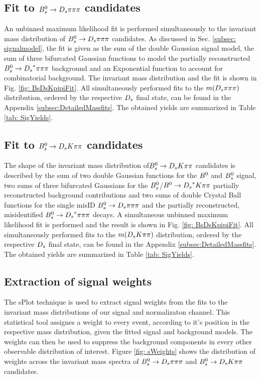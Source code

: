 \subsection{Fit to ${{B}^0_{s}}\rightarrow{\ensuremath{{D}_{s}}}{\ensuremath{\pi}}{\ensuremath{\pi}}{\ensuremath{\pi}}$ candidates}
\label{subsec: NormFit}

An unbinned maximum likelihood fit is performed simultaneously to the invariant mass distribution of ${{B}^0_{s}}\rightarrow{\ensuremath{{D}_{s}}}{\ensuremath{\pi}}{\ensuremath{\pi}}{\ensuremath{\pi}}$ candidates. 
As discussed in Sec. \ref{subsec: signalmodel}, the fit is given as the sum of the double Gaussian signal model, the sum of three bifurcated Gaussian functions to model the partially reconstructed ${{B}^0_{s}}\rightarrow{\ensuremath{{D}_{s}}}^{*}{\pi}{\pi}{\pi}$ background and an Exponential function to account for combinatorial background. The invariant mass distribution and the fit is shown in Fig. \ref{fig: BsDsKpipiFit}. 
All simultaneously performed fits to the $m({{D}_{s}}{\pi}{\pi}{\pi})$ distribution, ordered by the respective ${{D}_{s}}$ final state, can be found in the Appendix \ref{subsec:DetailedMassfits}.   
The obtained yields are summarized in Table \ref{tab: SigYields}. 


\subsection{Fit to ${{B}^0_{s}}\rightarrow{\ensuremath{{D}_{s}}}{\ensuremath{K}}{\ensuremath{\pi}}{\ensuremath{\pi}}$ candidates}
\label{subsec: SigFit}

The shape of the invariant mass distribution of${{B}^0_{s}}\rightarrow{\ensuremath{{D}_{s}}}{\ensuremath{K}}{\ensuremath{\pi}}{\ensuremath{\pi}}$ candidates is described by the sum of two double Gaussian functions for the ${{B}^0}$ and ${{B}^0_{s}}$ signal, 
two sums of three bifurcated Gaussians for the ${{B}^0_{s}}$/${{B}^0}\rightarrow{\ensuremath{{D}_{s}}}^{*}{K}{\pi}{\pi}$ partially reconstructed background contributions and 
two sums of double Crystal Ball functions for the single misID ${{B}^0_{s}}\rightarrow{\ensuremath{{D}_{s}}}{\ensuremath{\pi}}{\ensuremath{\pi}}{\ensuremath{\pi}}$ and the partially reconstructed, misidentified ${{B}^0_{s}}\rightarrow{\ensuremath{{D}_{s}}}^{*}{\pi}{\pi}{\pi}$ decays. 
A simultaneous unbinned maximum likelihood fit is performed and the result is shown in Fig. \ref{fig: BsDsKpipiFit}.
All simultaneously performed fits to the $m({{D}_{s}}{K}{\pi}{\pi})$ distribution, ordered by the respective ${{D}_{s}}$ final state, can be found in the Appendix \ref{subsec:DetailedMassfits}.
The obtained yields are summarized in Table \ref{tab: SigYields}.
 

\subsection{Extraction of signal weights}
\label{subsec: sWegihts}

The sPlot technique \cite{Pivk:2004ty} is used to extract signal weights from the fits to the invariant mass distributions of our signal and normalizaton channel. 
This statistical tool assignes a weight to every event, according to it's position in the respective mass distribution, given the fitted signal and background models. 
The weights can then be used to suppress the background components in every other observable distribution of interest.  
Figure \ref{fig: sWeights} shows the distribution of weights across the invariant mass spectra of ${{B}^0_{s}}\rightarrow{\ensuremath{{D}_{s}}}{\ensuremath{\pi}}{\ensuremath{\pi}}{\ensuremath{\pi}}$ and ${{B}^0_{s}}\rightarrow{\ensuremath{{D}_{s}}}{\ensuremath{K}}{\ensuremath{\pi}}{\ensuremath{\pi}}$ candidates.


